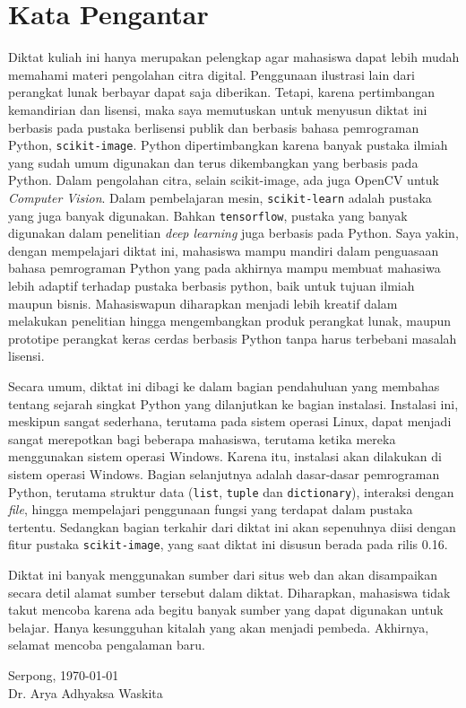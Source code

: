 \chapter*{Kata Pengantar}
Diktat kuliah ini hanya merupakan pelengkap agar mahasiswa dapat lebih mudah memahami materi pengolahan citra digital. Penggunaan ilustrasi lain dari perangkat lunak berbayar dapat saja diberikan. Tetapi, karena pertimbangan kemandirian dan lisensi, maka saya memutuskan untuk menyusun diktat ini berbasis pada pustaka berlisensi publik dan berbasis bahasa pemrograman Python, \texttt{scikit-image}. Python dipertimbangkan karena banyak pustaka ilmiah yang sudah umum digunakan dan terus dikembangkan yang berbasis pada Python. Dalam pengolahan citra, selain scikit-image, ada juga OpenCV untuk \textit{Computer Vision}. Dalam pembelajaran mesin, \texttt{scikit-learn} adalah pustaka yang juga banyak digunakan. Bahkan \texttt{tensorflow}, pustaka yang banyak digunakan dalam penelitian \textit{deep learning} juga berbasis pada Python. Saya yakin, dengan mempelajari diktat ini, mahasiswa mampu mandiri dalam penguasaan bahasa pemrograman Python yang pada akhirnya mampu membuat mahasiwa lebih adaptif terhadap pustaka berbasis python, baik untuk tujuan ilmiah maupun bisnis. Mahasiswapun diharapkan menjadi lebih kreatif dalam melakukan penelitian hingga mengembangkan produk perangkat lunak, maupun prototipe perangkat keras cerdas berbasis Python tanpa harus terbebani masalah lisensi.

Secara umum, diktat ini dibagi ke dalam bagian pendahuluan yang membahas tentang sejarah singkat Python yang dilanjutkan ke bagian instalasi. Instalasi ini, meskipun sangat sederhana, terutama pada sistem operasi Linux, dapat menjadi sangat merepotkan bagi beberapa mahasiswa, terutama ketika mereka menggunakan sistem operasi Windows. Karena itu, instalasi akan dilakukan di sistem operasi Windows. Bagian selanjutnya adalah dasar-dasar pemrograman Python, terutama struktur data (\texttt{list}, \texttt{tuple} dan \texttt{dictionary}), interaksi dengan \textit{file}, hingga mempelajari penggunaan fungsi yang terdapat dalam pustaka tertentu. Sedangkan bagian terkahir dari diktat ini akan sepenuhnya diisi dengan fitur pustaka \texttt{scikit-image}, yang saat diktat ini disusun berada pada rilis 0.16.

Diktat ini banyak menggunakan sumber dari situs web dan akan disampaikan secara detil alamat sumber tersebut dalam diktat. Diharapkan, mahasiswa tidak takut mencoba karena ada begitu banyak sumber yang dapat digunakan untuk belajar. Hanya kesungguhan kitalah yang akan menjadi pembeda. Akhirnya, selamat mencoba pengalaman baru. 

\vspace*{2cm}
\begin{flushright}
Serpong, \today\\[0.1cm]
\vspace*{1cm}
Dr. Arya Adhyaksa Waskita

\end{flushright}
